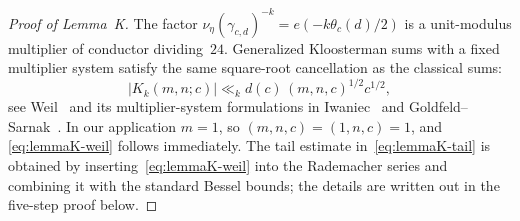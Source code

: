 \documentclass[11pt,a4paper]{article}
\begin{document}
\begin{proof}[Proof of Lemma~K]
The factor $\nu_{\eta}(\gamma_{c,d})^{-k}=e(-k\theta_c(d)/2)$ is a unit-modulus multiplier of conductor dividing~$24$. Generalized Kloosterman sums with a fixed multiplier system satisfy the same square-root cancellation as the classical sums:
\[
  |K_k(m,n;c)| \ll_k d(c)\,(m,n,c)^{1/2}c^{1/2},
\]
see Weil~\cite{Weil1948} and its multiplier-system formulations in Iwaniec~\cite{Iwaniec1997} and Goldfeld--Sarnak~\cite{goldfeld1983}. In our application $m=1$, so $(m,n,c)=(1,n,c)=1$, and \eqref{eq:lemmaK-weil} follows immediately. The tail estimate in~\eqref{eq:lemmaK-tail} is obtained by inserting~\eqref{eq:lemmaK-weil} into the Rademacher series and combining it with the standard Bessel bounds; the details are written out in the five-step proof below.
\end{proof}
\end{document}
